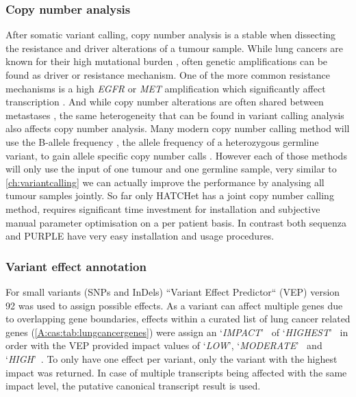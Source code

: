 \subsubsection{Copy number analysis}
\label{cascade-sec:cnv}
After somatic variant calling, copy number analysis is a stable when dissecting the resistance and driver alterations of a tumour sample. While lung cancers are known for their high mutational burden \cite{Alexandrov2020}, often genetic amplifications can be found as driver or resistance mechanism. One of the more common resistance mechanisms is a high \textit{EGFR} or \textit{MET} amplification which significantly affect transcription \cite{Bjaanaes2021}. And while copy number alterations are often shared between metastases \cite{Ni2013}, the same heterogeneity that can be found in variant calling analysis also affects copy number analysis. Many modern copy number calling method will use the B-allele frequency , the allele frequency of a heterozygous germline variant, to gain allele specific copy number calls \cite{Favero2015,Talevich2016,Cameron2019a}. However each of those methods will only use the input of one tumour and one germline sample, very similar to \autoref{ch:variantcalling} we can actually improve the performance by analysing all tumour samples jointly. So far only HATCHet \cite{Zaccaria2020} has a joint copy number calling method, requires significant time investment for installation and subjective manual parameter optimisation on a per patient basis. In contrast both sequenza and PURPLE have very easy installation and usage procedures.


\subsubsection{Variant effect annotation}
\label{cascade-sec:vep}
For small variants (SNPs and InDels) ``Variant Effect Predictor`` (VEP) version 92 \cite{McLaren2016} was used to assign possible effects. As a variant can affect multiple genes due to overlapping gene boundaries, effects within a curated list of lung cancer related genes (\autoref{A:cas:tab:lungcancergenes}) were assign an \lq\emph{IMPACT}\rq~ of \lq\emph{HIGHEST}\rq~ in order with the VEP provided impact values of \lq\emph{LOW}\rq, \lq\emph{MODERATE}\rq~ and \lq\emph{HIGH}\rq~. To only have one effect per variant, only the variant with the highest impact was returned. In case of multiple transcripts being affected with the same impact level, the putative canonical transcript result is used.

